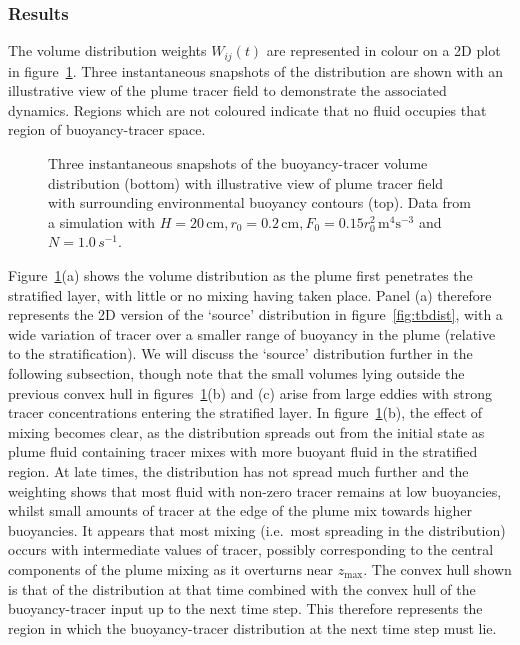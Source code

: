 \documentclass[a4paper]{article}
\begin{document}
\subsubsection{Results}
The volume distribution weights $W_{ij}(t)$ are represented in colour on a 2D plot in figure~\ref{fig:jointPDF}.
Three instantaneous snapshots of the distribution are shown with an illustrative view of the plume tracer
field to demonstrate the associated dynamics. Regions which are not coloured indicate that no fluid occupies
that region of buoyancy-tracer space.

\begin{figure}
	\centering
	\caption{Three instantaneous snapshots of the buoyancy-tracer volume distribution (bottom) with  illustrative view
	of plume tracer field with surrounding environmental buoyancy contours (top). Data from a simulation with
	$H = 20\,\mathrm{cm}, r_0 = 0.2 \, \mathrm{cm}, F_0 = 0.15r_0^2 \, \mathrm{m}^4 \mathrm{s}^{-3}$ and 
	$N = 1.0 \,s^{-1}$.}
	\label{fig:jointPDF}
\end{figure}

Figure~\ref{fig:jointPDF}(a) shows the volume distribution as the plume first penetrates the stratified layer, with
little or no mixing having taken place. Panel (a) therefore represents the 2D version of the `source'
distribution in figure~\ref{fig:tbdist}, with a wide variation of tracer over a smaller range of buoyancy in
the plume (relative to the stratification). We will discuss the `source' distribution further in the following
subsection, though note that the small volumes lying outside the previous convex hull in
figures~\ref{fig:jointPDF}(b) and (c) arise from large eddies with strong tracer concentrations entering the
stratified layer. In figure~\ref{fig:jointPDF}(b), the effect of mixing becomes clear, as the distribution
spreads out from the initial state as plume fluid containing tracer mixes with more buoyant fluid in the
stratified region. At late times, the distribution has not spread much further and the weighting shows that
most fluid with non-zero tracer remains at low buoyancies, whilst small amounts of tracer at the edge of the
plume mix towards higher buoyancies. It appears that most mixing (i.e.\  most spreading in the distribution)
occurs with intermediate values of tracer, possibly corresponding to the central components of the plume
mixing as it overturns near $z_{\max}$. The convex hull shown is that of the distribution at that time
combined with the convex hull of the buoyancy-tracer input up to the next time step. This therefore represents
the region in which the buoyancy-tracer distribution at the next time step must lie.
	
\end{document}

